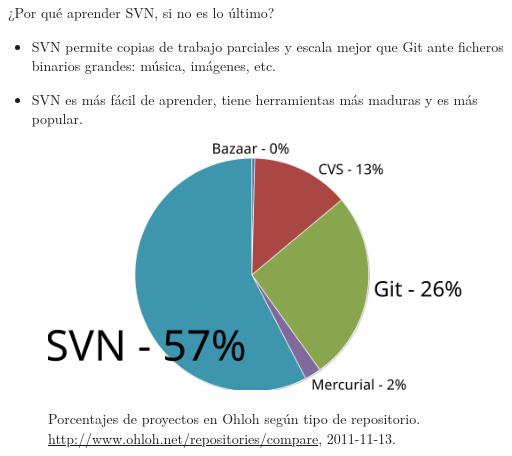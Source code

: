\documentclass[xcolor=svgnames]{beamer}
\begin{document}
\begin{frame}{¿Por qué aprender SVN, si no es lo último?}

  \begin{itemize}
  \item SVN permite copias de trabajo parciales y escala mejor que Git
    ante ficheros binarios grandes: música, imágenes, etc.
  \item SVN es más fácil de aprender, tiene herramientas más maduras y es más popular.
  \end{itemize}

  \begin{figure}
    \centering
    \includegraphics[width=.8\textwidth,height=.5\textheight,keepaspectratio]{compare-repos-ohloh}

    \small Porcentajes de proyectos en Ohloh según tipo de
    repositorio. \url{http://www.ohloh.net/repositories/compare},
    2011-11-13.
  \end{figure}

\end{frame}
\end{document}
